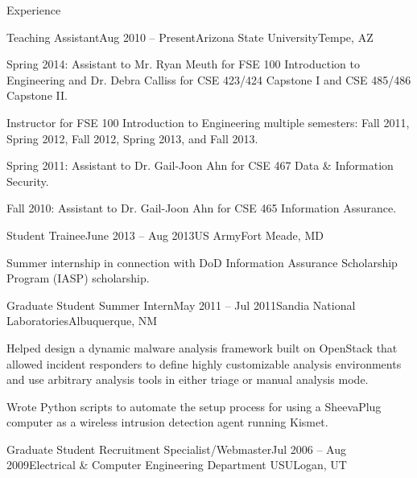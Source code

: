\documentclass{resume} %
\begin{document}
\begin{rSection}{Experience}
\begin{rSubsection}{Teaching Assistant}{Aug 2010 -- Present}{Arizona State University}{Tempe, AZ}
	\item Spring 2014: Assistant to Mr. Ryan Meuth for FSE 100 Introduction to Engineering and Dr. Debra Calliss for CSE 423/424 Capstone I and CSE 485/486 Capstone II.
	
	\item Instructor for FSE 100 Introduction to Engineering multiple semesters: Fall 2011, Spring 2012, Fall 2012, Spring 2013, and Fall 2013.
	
	\item Spring 2011: Assistant to Dr. Gail-Joon Ahn for CSE 467 Data \& Information Security.
	
	\item Fall 2010: Assistant to Dr. Gail-Joon Ahn for CSE 465 Information Assurance.
	
\end{rSubsection}


\begin{rSubsection}{Student Trainee}{June 2013 -- Aug 2013}{US Army}{Fort Meade, MD}


	\item Summer internship in connection with DoD Information Assurance Scholarship Program (IASP) scholarship.

\end{rSubsection}


\begin{rSubsection}{Graduate Student Summer Intern}{May 2011 -- Jul 2011}{Sandia National Laboratories}{Albuquerque, NM}

	\item Helped design a dynamic malware analysis framework built on OpenStack that allowed incident responders to define highly customizable analysis environments and use arbitrary analysis tools in either triage or manual analysis mode.
	
	\item Wrote Python scripts to automate the setup process for using a SheevaPlug computer as a wireless intrusion detection agent running Kismet.

\end{rSubsection}


\begin{rSubsection}{Graduate Student Recruitment Specialist/Webmaster}{Jul 2006 -- Aug 2009}{Electrical \& Computer Engineering Department USU}{Logan, UT}


\end{rSubsection}
\end{rSection}
\end{document}

